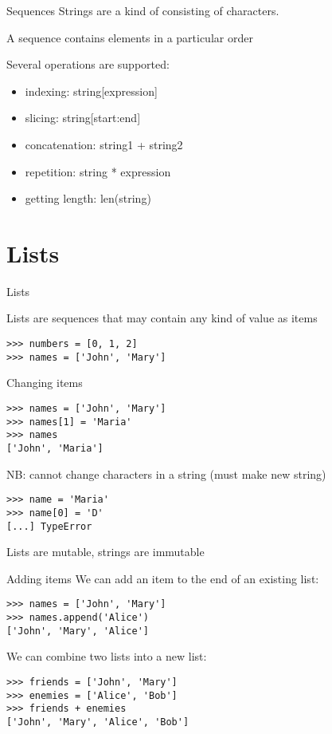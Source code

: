 \documentclass[aspectratio=169,usenames,dvipsnames]{beamer}
\begin{document}
\begin{frame}{Sequences}
    Strings are a kind of 
    consisting of characters.

    A sequence contains elements in a particular order

    Several operations are supported:
    \begin{itemize}
        \item indexing:                    string[expression]
        \item slicing:                     string[start:end]
        \item concatenation:               string1 + string2
        \item repetition:                  string * expression
        \item getting length:              len(string)
    \end{itemize}
\end{frame}


\section{Lists}
\frame{\tableofcontents[currentsection]}

\begin{frame}[fragile]{Lists}
    \begin{definition}
    Lists are sequences that may contain any kind of value as items
    \end{definition}
\begin{lstlisting} 
>>> numbers = [0, 1, 2]
>>> names = ['John', 'Mary']
\end{lstlisting} 
\end{frame}

\begin{frame}[fragile]{Changing items}
\begin{lstlisting} 
>>> names = ['John', 'Mary']
>>> names[1] = 'Maria'
>>> names
['John', 'Maria']
\end{lstlisting} 

\pause
NB: cannot change characters in a string (must make new string)
\begin{lstlisting} 
>>> name = 'Maria'
>>> name[0] = 'D'
[...] TypeError
\end{lstlisting}

Lists are mutable, strings are immutable
\end{frame}


\begin{frame}[fragile]{Adding items}
We can add an item to the end of an existing list:
\begin{lstlisting} 
>>> names = ['John', 'Mary']
>>> names.append('Alice')
['John', 'Mary', 'Alice']
\end{lstlisting}

\pause
We can combine two lists into a new list:
\begin{lstlisting} 
>>> friends = ['John', 'Mary']
>>> enemies = ['Alice', 'Bob']
>>> friends + enemies
['John', 'Mary', 'Alice', 'Bob']
\end{lstlisting}
\end{frame}
\end{document}
